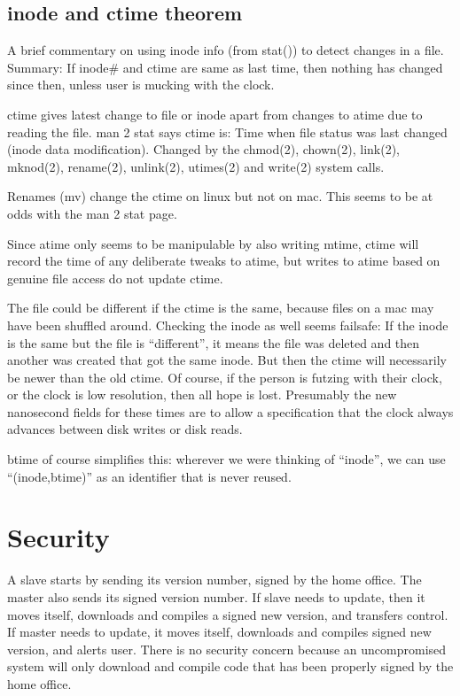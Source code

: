 \documentclass{book}
\begin{document}
\subsection{inode and ctime theorem}

A brief commentary on using inode info (from stat()) to detect changes in a file.
Summary:  If inode\# and ctime are same as last time, then nothing has changed since then, unless user is mucking with the clock.

ctime gives latest change to file or inode apart from changes to atime due to reading the file.
man 2 stat says ctime is: Time when file status was last changed (inode data modification).  Changed by the chmod(2), chown(2), link(2), mknod(2), rename(2), unlink(2), utimes(2) and write(2) system calls.

Renames (mv) change the ctime on linux but not on mac.  This seems to be at odds with the man 2 stat page.

Since atime only seems to be manipulable by also writing mtime, ctime will record the time of any deliberate tweaks to atime, but writes to atime based on genuine file access do not update ctime.

The file could be different if the ctime is the same, because files on a mac may have been shuffled around.  Checking the inode as well seems failsafe:  If the inode is the same but the file is ``different'', it means the file was deleted and then another was created that got the same inode.  But then the ctime will necessarily be newer than the old ctime.  Of course, if the person is futzing with their clock, or the clock is low resolution, then all hope is lost.  Presumably the new nanosecond fields for these times are to allow a specification that the clock always advances between disk writes or disk reads.

btime of course simplifies this: wherever we were thinking of ``inode'', we can use ``(inode,btime)'' as an identifier that is never reused.







\section{Security}

A slave starts by sending its version number, signed by the home office.  The master also sends its signed version number.  If slave needs to update, then it moves itself, downloads and compiles a signed new version, and transfers control.  If master needs to update, it moves itself, downloads and compiles signed new version, and alerts user.
There is no security concern because an uncompromised system will only download and compile code that has been properly signed by the home office.
\end{document}
